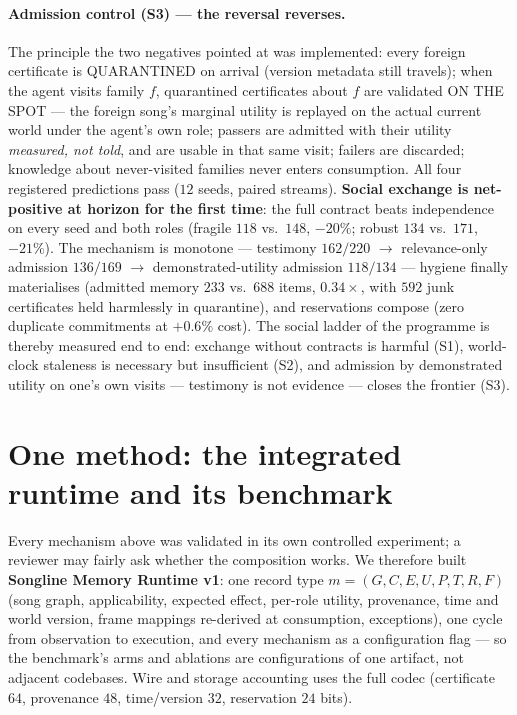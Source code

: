 \documentclass{article}
\begin{document}
\paragraph{Admission control (S3) --- the reversal reverses.} The
principle the two negatives pointed at was implemented: every foreign
certificate is QUARANTINED on arrival (version metadata still
travels); when the agent visits family $f$, quarantined certificates
about $f$ are validated ON THE SPOT --- the foreign song's marginal
utility is replayed on the actual current world under the agent's own
role; passers are admitted with their utility \emph{measured, not
told}, and are usable in that same visit; failers are discarded;
knowledge about never-visited families never enters consumption. All
four registered predictions pass ($12$ seeds, paired streams).
\textbf{Social exchange is net-positive at horizon for the first
time}: the full contract beats independence on every seed and both
roles (fragile $118$ vs.\ $148$, $-20\%$; robust $134$ vs.\ $171$,
$-21\%$). The mechanism is monotone --- testimony $162/220$ $\to$
relevance-only admission $136/169$ $\to$ demonstrated-utility
admission $118/134$ --- hygiene finally materialises (admitted
memory $233$ vs.\ $688$ items, $0.34\times$, with $592$ junk
certificates held harmlessly in quarantine), and reservations compose
(zero duplicate commitments at $+0.6\%$ cost). The social ladder of
the programme is thereby measured end to end: exchange without
contracts is harmful (S1), world-clock staleness is necessary but
insufficient (S2), and admission by demonstrated utility on one's own
visits --- testimony is not evidence --- closes the frontier (S3).


\section{One method: the integrated runtime and its benchmark}
\label{sec:integration}

Every mechanism above was validated in its own controlled experiment;
a reviewer may fairly ask whether the composition works. We therefore
built \textbf{Songline Memory Runtime v1}: one record type $m = (G,
C, E, U, P, T, R, F)$ (song graph, applicability, expected effect,
per-role utility, provenance, time and world version, frame mappings
re-derived at consumption, exceptions), one cycle from observation to
execution, and every mechanism as a configuration flag --- so the
benchmark's arms and ablations are configurations of one artifact,
not adjacent codebases. Wire and storage accounting uses the full
codec (certificate $64$, provenance $48$, time/version $32$,
reservation $24$ bits).
\end{document}
